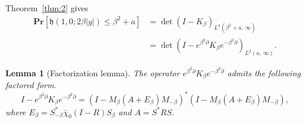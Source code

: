 \documentclass[10pt]{amsart}
\newtheorem{lemm}[theo]{Lemma}\newtheorem{prop}[theo]{Proposition}\newtheorem{coro}[theo]{Corollary}\newtheorem{conj}[theo]{Conjecture}
\theoremstyle{definition}\newtheorem{defi}[theo]{Definition}\newtheorem{rema}[theo]{Remark}\newtheorem{exam}[theo]{Example}\newtheorem{exem}[theo]{Example}\newtheorem{nota}[theo]{Notation}
\newcommand{\pr}[1]{\mathbf{Pr}\left[#1\right]}
\newcommand{\h}{\mathfrak{h}}
\begin{document}
Theorem~\ref{thm:2} gives
\begin{align}\label{eqn:h10a}
\pr{\h(1,0; 2\beta |y|) \leq \beta^2 + a} &= \det \left (I - K_{\beta} \right)_{L^2(\beta^2 + a,\,\infty)} \\
\nonumber &= \det \left (I - e^{\beta^2 \partial} K_{\beta} e^{-\beta^2 \partial} \right)_{L^2(a,\,\infty)}.
\end{align}

\begin{lemm}[Factorization lemma] \label{lem:factor}
The operator $e^{\beta^2 \partial} K_{\beta} e^{-\beta^2 \partial}$ admits the following factored form.
\[
I - e^{\beta^2 \partial} K_{\beta} e^{-\beta^2 \partial} =
\left (I - M_{\beta}(A+ E_{\beta})M_{-\beta} \right)^{*} \left(I - M_{\beta}(A+ E_{\beta})M_{-\beta} \right),
\]
where $E_{\beta} = S_{-\beta}^{*} \bar{\chi}_0 (I-R) S_{\beta}$ and $A = S^{*} R S$.
\end{lemm}
\end{document}
